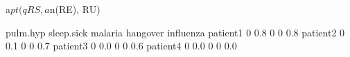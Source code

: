 \begin{Schunk}
% --begin: "comp.quant.combined"
\begin{Sinput}
 a$pt(qRS, a$n(RE), RU)
\end{Sinput}
\begin{Soutput}
         pulm.hyp sleep.sick malaria hangover influenza
patient1        0        0.8       0        0       0.8
patient2        0        0.1       0        0       0.7
patient3        0        0.0       0        0       0.6
patient4        0        0.0       0        0       0.0
\end{Soutput}
%
% --end: "comp.quant.combined"
\end{Schunk}
